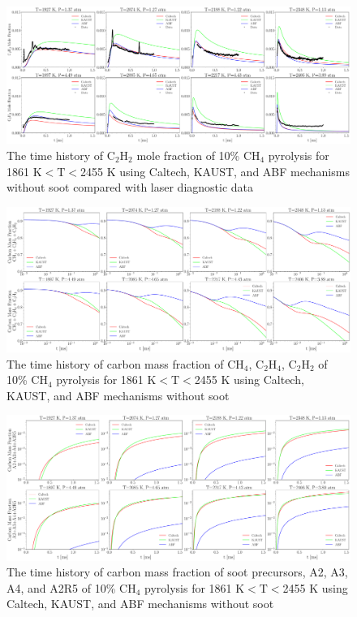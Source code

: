 \begin{figure}[H]
	\centering
	\includegraphics[width=1\textwidth]{Figures/Results/Shocktube/Stanford/September/10CH4_C2H4_mechs_nosoot.pdf}
	\caption{The time history of $\mathrm{C_2H_2}$ mole fraction of 10\% $\mathrm{CH_4}$ pyrolysis for 1861 K$<\mathrm{T}<$2455 K using Caltech, KAUST, and ABF mechanisms without soot compared with laser diagnostic data}
	\label{fig:shocktubest_10ch4_nosoot_c2h2} 
\end{figure}

\begin{figure}[H]
	\centering
	\includegraphics[width=1\textwidth]{Figures/Results/Shocktube/Stanford/September/10CH4_CCC_mechs_nosoot.pdf}
	\caption{The time history of carbon mass fraction of $\mathrm{CH_4}$, $\mathrm{C_2H_4}$, $\mathrm{C_2H_2}$ of 10\% $\mathrm{CH_4}$ pyrolysis for 1861 K$<\mathrm{T}<$2455 K using Caltech, KAUST, and ABF mechanisms without soot}
	\label{fig:shocktubest_10ch4_nosoot_ccc} 
\end{figure}


\begin{figure}[H]
	\centering
	\includegraphics[width=1\textwidth]{Figures/Results/Shocktube/Stanford/September/10CH4_SPC_mechs_nosoot.pdf}
	\caption{The time history of carbon mass fraction of soot precursors, A2, A3, A4, and A2R5 of 10\% $\mathrm{CH_4}$ pyrolysis for 1861 K$<\mathrm{T}<$2455 K using Caltech, KAUST, and ABF mechanisms without soot}
	\label{fig:shocktubest_10ch4_nosoot_spc} 
\end{figure}


